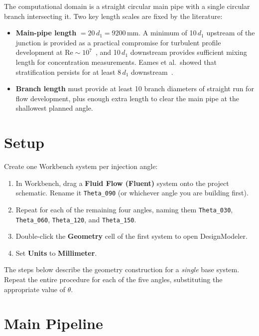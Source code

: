 \documentclass[12pt,a4paper]{report}
\begin{document}
The computational domain is a straight circular main pipe with a single
circular branch intersecting it.  Two key length scales are fixed by the
literature:

\begin{itemize}
  \item \textbf{Main-pipe length} $= 20\,d_1 = 9200$\,mm.
        A minimum of 10\,$d_1$ upstream of the junction is provided
        as a practical compromise for turbulent profile development at
        $\mathrm{Re} \sim 10^7$~\cite{Schlichting2017}, and 10\,$d_1$ downstream
        provides sufficient mixing length for concentration measurements.
        Eames et al.\ showed that stratification persists for at least
        8\,$d_1$ downstream~\cite{Eames2022}.
  \item \textbf{Branch length} must provide at least 10 branch diameters of
        straight run for flow development, plus enough extra length to clear
        the main pipe at the shallowest planned angle.
\end{itemize}


\section{Setup}

Create one Workbench system per injection angle:

\begin{enumerate}
  \item In Workbench, drag a \textbf{Fluid Flow (Fluent)} system onto the
        project schematic.  Rename it \texttt{Theta\_090} (or whichever
        angle you are building first).
  \item Repeat for each of the remaining four angles, naming them
        \texttt{Theta\_030}, \texttt{Theta\_060}, \texttt{Theta\_120},
        and \texttt{Theta\_150}.
  \item Double-click the \textbf{Geometry} cell of the first system to
        open DesignModeler.
  \item Set \textbf{Units} to \textbf{Millimeter}.
\end{enumerate}

\noindent The steps below describe the geometry construction for a
\emph{single} base system.  Repeat the entire procedure for each of the
five angles, substituting the appropriate value of $\theta$.


\section{Main Pipeline}
\end{document}
